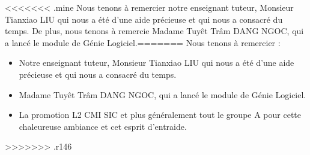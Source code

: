<<<<<<< .mine
Nous tenons à remercier notre enseignant tuteur, Monsieur Tianxiao LIU qui nous a été d'une aide précieuse et qui nous a consacré du temps. De plus, nous tenons à remercie Madame Tuyêt Trâm DANG NGOC, qui a lancé le module de Génie Logiciel.=======
Nous tenons à remercier :
\begin{itemize}
 \item Notre enseignant tuteur, Monsieur Tianxiao LIU qui nous a été d'une aide précieuse et qui nous a consacré du temps.
 \item Madame Tuyêt Trâm DANG NGOC, qui a lancé le module de Génie Logiciel.
 \item La promotion L2 CMI SIC et plus généralement tout le groupe A pour cette chaleureuse ambiance et cet esprit d'entraide.
\end{itemize}>>>>>>> .r146
